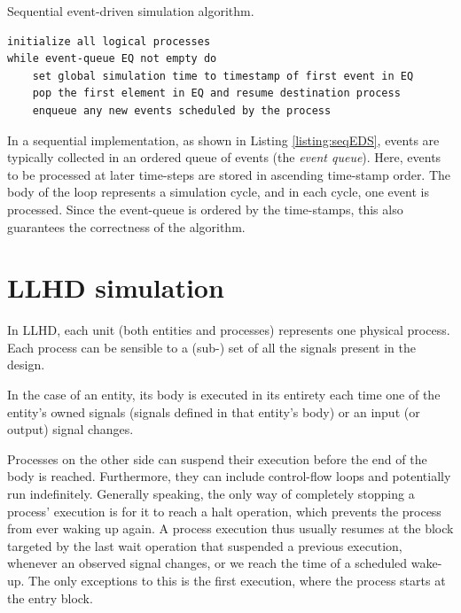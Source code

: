 \begin{listing}[ht]
    \caption{Sequential event-driven simulation algorithm.}
    \label{listing:seqEDS}
    \begin{verbatim}
initialize all logical processes
while event-queue EQ not empty do
    set global simulation time to timestamp of first event in EQ
    pop the first element in EQ and resume destination process
    enqueue any new events scheduled by the process
    \end{verbatim}
\end{listing}

In a sequential implementation, as shown in Listing \ref{listing:seqEDS}, events are typically collected in an ordered queue of events (the \textit{event queue}). Here, events to be processed at later time-steps are stored in ascending time-stamp order. The body of the loop represents a simulation cycle, and in each cycle, one event is processed. Since the event-queue is ordered by the time-stamps, this also guarantees the correctness of the algorithm.


\section{LLHD simulation}
In LLHD, each unit (both entities and processes) represents one physical process. Each process can be sensible to a (sub-) set of all the signals present in the design.

In the case of an entity, its body is executed in its entirety each time one of the entity's owned signals (signals defined in that entity's body) or an input (or output) signal changes.

Processes on the other side can suspend their execution before the end of the body is reached. Furthermore, they can include control-flow loops and potentially run indefinitely. Generally speaking, the only way of completely stopping a process' execution is for it to reach a halt operation, which prevents the process from ever waking up again. A process execution thus usually resumes at the block targeted by the last wait operation that suspended a previous execution, whenever an observed signal changes, or we reach the time of a scheduled wake-up. The only exceptions to this is the first execution, where the process starts at the entry block.

